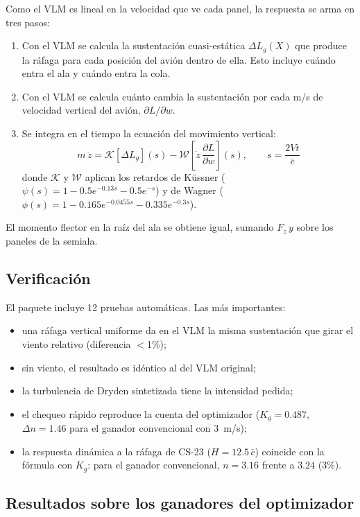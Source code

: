 \documentclass[11pt]{article}
\begin{document}
Como el VLM es lineal en la velocidad que ve cada panel, la respuesta se
arma en tres pasos:
\begin{enumerate}[nosep]
  \item Con el VLM se calcula la sustentación cuasi-estática $\Delta L_g(X)$
  que produce la ráfaga para cada posición del avión dentro de ella. Esto
  incluye cuándo entra el ala y cuándo entra la cola.
  \item Con el VLM se calcula cuánto cambia la sustentación por cada m/s de
  velocidad vertical del avión, $\partial L/\partial w$.
  \item Se integra en el tiempo la ecuación del movimiento vertical:
  \begin{equation}
  m\,\ddot z = \mathcal{K}\!\left[\Delta L_g\right](s) - \mathcal{W}\!\left[\dot z\,\frac{\partial L}{\partial w}\right](s),
  \qquad s = \frac{2Vt}{\bar c}
  \end{equation}
  donde $\mathcal{K}$ y $\mathcal{W}$ aplican los retardos de Küssner
  ($\psi(s)=1-0.5e^{-0.13s}-0.5e^{-s}$) y de Wagner
  ($\phi(s)=1-0.165e^{-0.0455s}-0.335e^{-0.3s}$).
\end{enumerate}
El momento flector en la raíz del ala se obtiene igual, sumando
$F_z\,y$ sobre los paneles de la semiala.

\subsection{Verificación}

El paquete incluye 12 pruebas automáticas. Las más importantes:
\begin{itemize}[nosep]
  \item una ráfaga vertical uniforme da en el VLM la misma sustentación que
  girar el viento relativo (diferencia $<$1\%);
  \item sin viento, el resultado es idéntico al del VLM original;
  \item la turbulencia de Dryden sintetizada tiene la intensidad pedida;
  \item el chequeo rápido reproduce la cuenta del optimizador
  ($K_g=0.487$, $\Delta n=1.46$ para el ganador convencional con 3~m/s);
  \item la respuesta dinámica a la ráfaga de CS-23 ($H=12.5\,\bar c$)
  coincide con la fórmula con $K_g$: para el ganador convencional,
  $n=3.16$ frente a $3.24$ (3\%).
\end{itemize}

\subsection{Resultados sobre los ganadores del optimizador}
\end{document}
